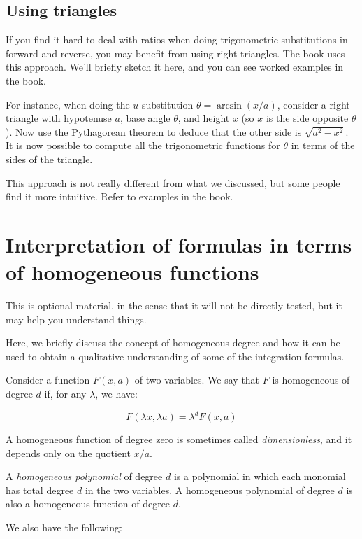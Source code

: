 \documentclass[10pt]{amsart}
\begin{document}
\subsection*{Using triangles}

If you find it hard to deal with ratios when doing trigonometric
substitutions in forward and reverse, you may benefit from using right
triangles. The book uses this approach. We'll briefly sketch it here,
and you can see worked examples in the book.

For instance, when doing the $u$-substitution $\theta = \arcsin(x/a)$,
consider a right triangle with hypotenuse $a$, base angle $\theta$,
and height $x$ (so $x$ is the side opposite $\theta$). Now use the
Pythagorean theorem to deduce that the other side is $\sqrt{a^2 -
x^2}$. It is now possible to compute all the trigonometric functions
for $\theta$ in terms of the sides of the triangle.

This approach is not really different from what we discussed, but some
people find it more intuitive. Refer to examples in the book.

\section{Interpretation of formulas in terms of homogeneous functions}

This is optional material, in the sense that it will not be directly
tested, but it may help you understand things.

Here, we briefly discuss the concept of homogeneous degree and how it
can be used to obtain a qualitative understanding of some of the
integration formulas.

Consider a function $F(x,a)$ of two variables. We say that $F$ is
homogeneous of degree $d$ if, for any $\lambda$, we have:

$$F(\lambda x, \lambda a) = \lambda^d F(x,a)$$

A homogeneous function of degree zero is sometimes called {\em
dimensionless}, and it depends only on the quotient $x/a$.

A {\em homogeneous polynomial} of degree $d$ is a polynomial in which
each monomial has total degree $d$ in the two variables. A homogeneous
polynomial of degree $d$ is also a homogeneous function of degree $d$.

We also have the following:
\end{document}
